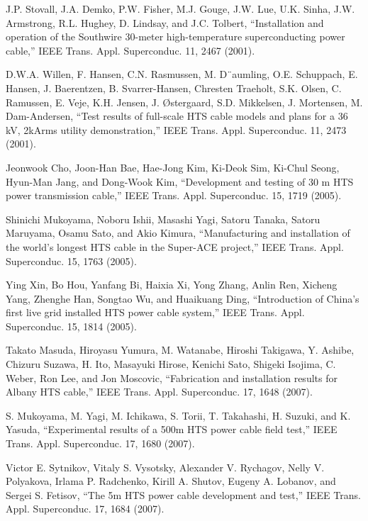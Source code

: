 \noindent [9.183] J.P. Stovall, J.A. Demko, P.W. Fisher, M.J. Gouge, J.W. Lue, U.K. Sinha, J.W.
Armstrong, R.L. Hughey, D. Lindsay, and J.C. Tolbert, ``Installation and operation
of the Southwire 30-meter high-temperature superconducting power cable,”
IEEE Trans. Appl. Superconduc. 11, 2467 (2001).

\noindent [9.184] D.W.A. Willen, F. Hansen, C.N. Rasmussen, M. D¨aumling, O.E. Schuppach, E.
Hansen, J. Baerentzen, B. Svarrer-Hansen, Chresten Traeholt, S.K. Olsen, C. Ramussen,
E. Veje, K.H. Jensen, J. Østergaard, S.D. Mikkelsen, J. Mortensen, M.
Dam-Andersen, ``Test results of full-scale HTS cable models and plans for a 36 kV,
2kArms utility demonstration,” IEEE Trans. Appl. Superconduc. 11, 2473 (2001).

\noindent [9.185] Jeonwook Cho, Joon-Han Bae, Hae-Jong Kim, Ki-Deok Sim, Ki-Chul Seong,
Hyun-Man Jang, and Dong-Wook Kim, ``Development and testing of 30 m HTS
power transmission cable,” IEEE Trans. Appl. Superconduc. 15, 1719 (2005).

\noindent [9.186] Shinichi Mukoyama, Noboru Ishii, Masashi Yagi, Satoru Tanaka, Satoru Maruyama,
Osamu Sato, and Akio Kimura, ``Manufacturing and installation of the
world’s longest HTS cable in the Super-ACE project,” IEEE Trans. Appl. Superconduc.
15, 1763 (2005).

\noindent [9.187] Ying Xin, Bo Hou, Yanfang Bi, Haixia Xi, Yong Zhang, Anlin Ren, Xicheng Yang,
Zhenghe Han, Songtao Wu, and Huaikuang Ding, ``Introduction of China’s first
live grid installed HTS power cable system,” IEEE Trans. Appl. Superconduc. 15,
1814 (2005).

\noindent [9.188] Takato Masuda, Hiroyasu Yumura, M. Watanabe, Hiroshi Takigawa, Y. Ashibe,
Chizuru Suzawa, H. Ito, Masayuki Hirose, Kenichi Sato, Shigeki Isojima, C. Weber,
Ron Lee, and Jon Moscovic, ``Fabrication and installation results for Albany
HTS cable,” IEEE Trans. Appl. Superconduc. 17, 1648 (2007).

\noindent [9.189] S. Mukoyama, M. Yagi, M. Ichikawa, S. Torii, T. Takahashi, H. Suzuki, and
K. Yasuda, ``Experimental results of a 500m HTS power cable field test,” IEEE
Trans. Appl. Superconduc. 17, 1680 (2007).

\noindent [9.190] Victor E. Sytnikov, Vitaly S. Vysotsky, Alexander V. Rychagov, Nelly V. Polyakova,
Irlama P. Radchenko, Kirill A. Shutov, Eugeny A. Lobanov, and Sergei
S. Fetisov, ``The 5m HTS power cable development and test,” IEEE Trans. Appl.
Superconduc. 17, 1684 (2007).

